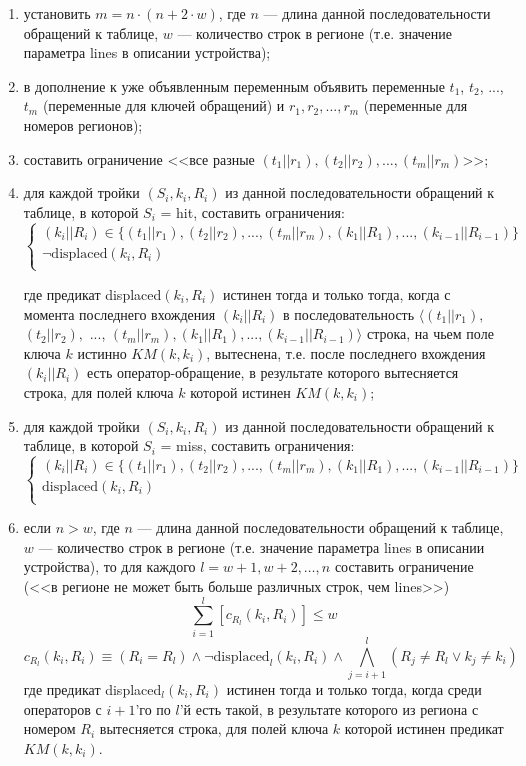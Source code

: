 \begin{enumerate}
    \item установить $m = n \cdot (n + 2\cdot w)$, где $n$ --- длина данной последовательности обращений к таблице, $w$ --- количество строк в регионе (т.е. значение параметра lines в описании устройства);
    \item в дополнение к уже объявленным переменным объявить переменные $t_1$, $t_2$, ..., $t_m$ (переменные для ключей обращений) и $r_1, r_2, ..., r_m$ (переменные для номеров регионов);
    \item составить ограничение <<все разные $(t_1||r_1), (t_2||r_2), ..., (t_m||r_m)$>>;
    \item для каждой тройки $(S_i, k_i, R_i)$ из данной последовательности обращений к таблице, в которой $S_i$ = hit, составить ограничения:
$$\left\{\begin{array}{l}
    (k_i||R_i) \in \{(t_1||r_1), (t_2||r_2), ..., (t_m||r_m), (k_1||R_1), ..., (k_{i-1}||R_{i-1}) \}\\
    \neg \mbox{displaced}(k_i, R_i)\\
\end{array}\right.$$

где предикат displaced$(k_i, R_i)$ истинен тогда и только тогда, когда с момента последнего вхождения $(k_i||R_i)$ в последовательность $\langle (t_1||r_1),$ $(t_2||r_2),$ ..., $(t_m||r_m), (k_1||R_1), ..., (k_{i-1}||R_{i-1})\rangle$ строка, на чьем поле ключа $k$ истинно $KM(k, k_i)$, вытеснена, т.е. после последнего вхождения $(k_i||R_i)$ есть оператор-обращение, в результате которого вытесняется строка, для полей ключа $k$ которой истинен $KM(k, k_i)$;

    \item для каждой тройки $(S_i, k_i, R_i)$ из данной последовательности обращений к таблице, в которой $S_i$ = miss, составить ограничения:
$$\left\{\begin{array}{l}
    (k_i||R_i) \in \{(t_1||r_1), (t_2||r_2), ..., (t_m||r_m), (k_1||R_1), ...,
(k_{i-1}||R_{i-1}) \}\\
    \mbox{displaced}(k_i, R_i)\\
\end{array}\right.$$

    \item если $n > w$, где $n$ --- длина данной последовательности обращений к таблице, $w$ --- количество строк в регионе (т.е. значение параметра lines в описании устройства), то для каждого $l = w+1, w+2, \dots, n$ составить ограничение (<<в регионе не может быть больше различных строк, чем lines>>)
$$\sum_{i=1}^l [c_{R_l} (k_i, R_i)] \leqslant w$$
$$c_{R_l} (k_i, R_i) \equiv (R_i = R_l ) \wedge \neg \mbox{displaced}_l (k_i, R_i) \wedge \bigwedge_{j=i+1}^{l} (R_j \neq R_l \vee k_j \neq k_i)$$
где предикат displaced$_l (k_i, R_i)$ истинен тогда и только тогда, когда среди операторов с $i+1$'го по $l$'й есть такой, в результате которого из региона с номером $R_i$ вытесняется строка, для полей ключа $k$ которой истинен предикат $KM(k, k_i)$.
\end{enumerate}

